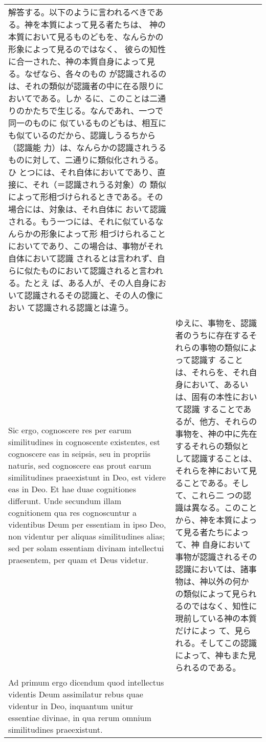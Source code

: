\documentclass[10pt]{jsarticle} %
\begin{document}
\begin{longtable}{p{21em}p{21em}}
解答する。以下のように言われるべきである。神を本質によって見る者たちは、
神の本質において見るものどもを、なんらかの形象によって見るのではなく、
彼らの知性に合一された、神の本質自身によって見る。なぜなら、各々のもの
が認識されるのは、それの類似が認識者の中に在る限りにおいてである。しか
るに、このことは二通りのかたちで生じる。なんであれ、一つで同一のものに
似ているものどもは、相互にも似ているのだから、認識しうるちから（認識能
力）は、なんらかの認識されうるものに対して、二通りに類似化されうる。ひ
とつには、それ自体においてであり、直接に、それ（＝認識されうる対象）の
類似によって形相づけられるときである。その場合には、対象は、それ自体に
おいて認識される。もう一つには、それに似ているなんらかの形象によって形
相づけられることにおいてであり、この場合は、事物がそれ自体において認識
されるとは言われず、自らに似たものにおいて認識されると言われる。たとえ
ば、ある人が、その人自身において認識されるその認識と、その人の像におい
て認識される認識とは違う。



\\

 Sic ergo, cognoscere
 res per earum similitudines in cognoscente existentes, est cognoscere
 eas in seipsis, seu in propriis naturis, sed cognoscere eas prout earum
 similitudines praeexistunt in Deo, est videre eas in Deo. Et hae duae
 cognitiones differunt. Unde secundum illam cognitionem qua res
 cognoscuntur a videntibus Deum per essentiam in ipso Deo, non videntur
 per aliquas similitudines alias; sed per solam essentiam divinam
 intellectui praesentem, per quam et Deus videtur.


&



ゆえに、事物を、認識者のうちに存在するそれらの事物の類似によって認識す
ることは、それらを、それ自身において、あるいは、固有の本性において認識
することであるが、他方、それらの事物を、神の中に先在するそれらの類似と
して認識することは、それらを神において見ることである。そして、これら二
つの認識は異なる。このことから、神を本質によって見る者たちによって、神
自身において事物が認識されるその認識においては、諸事物は、神以外の何か
の類似によって見られるのではなく、知性に現前している神の本質だけによっ
て、見られる。そしてこの認識によって、神もまた見られるのである。


\\


{\sc  Ad primum ergo dicendum} quod intellectus videntis Deum
 assimilatur rebus quae videntur in Deo, inquantum unitur essentiae
 divinae, in qua rerum omnium similitudines praeexistunt.



\end{longtable}
\end{document}
